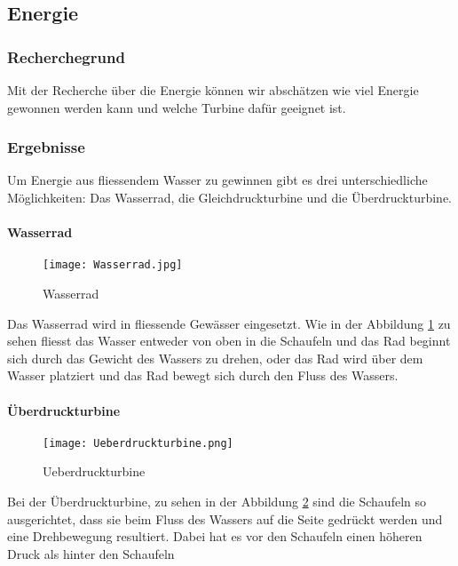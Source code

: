 \subsection{Energie}

\subsubsection{Recherchegrund}

Mit der Recherche über die Energie können wir abschätzen wie viel Energie gewonnen werden kann und welche Turbine dafür geeignet ist.

\subsubsection{Ergebnisse}

Um Energie aus fliessendem Wasser zu gewinnen gibt es drei unterschiedliche Möglichkeiten: Das Wasserrad, die Gleichdruckturbine und die Überdruckturbine. 

\paragraph{Wasserrad}
\begin{figure}[H]
	\centering
	\texttt{[image: Wasserrad.jpg]}
	\caption{Wasserrad}
	\label{fig:Wasserrad}
\end{figure}

Das Wasserrad wird in fliessende Gewässer eingesetzt. Wie in der Abbildung \ref{fig:Wasserrad}  zu sehen fliesst das Wasser entweder von oben in die Schaufeln und das Rad beginnt sich durch das Gewicht des Wassers zu drehen, oder das Rad wird über dem Wasser platziert und das Rad bewegt sich durch den Fluss des Wassers.

\newpage

\paragraph{Überdruckturbine}
\begin{figure} [H]
	\centering
	\texttt{[image: Ueberdruckturbine.png]}
	\caption{Ueberdruckturbine}
	\label{fig:Ueberdruckturbine}
\end{figure}

Bei der Überdruckturbine, zu sehen in der Abbildung \ref{fig:Ueberdruckturbine}  sind die Schaufeln so ausgerichtet, dass sie beim Fluss des Wassers auf die Seite gedrückt werden und eine Drehbewegung resultiert. Dabei hat es vor den Schaufeln einen höheren Druck als hinter den Schaufeln

